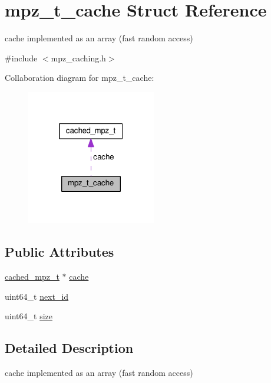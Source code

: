 \hypertarget{structmpz__t__cache}{}\section{mpz\+\_\+t\+\_\+cache Struct Reference}
\label{structmpz__t__cache}


cache implemented as an array (fast random access)  




{\ttfamily \#include $<$mpz\+\_\+caching.\+h$>$}



Collaboration diagram for mpz\+\_\+t\+\_\+cache\+:\nopagebreak
\begin{figure}[H]
\begin{center}
\leavevmode
\includegraphics[width=160pt]{structmpz__t__cache__coll__graph}
\end{center}
\end{figure}
\subsection*{Public Attributes}
\begin{DoxyCompactItemize}
\item 
\hyperlink{structcached__mpz__t}{cached\+\_\+mpz\+\_\+t} $\ast$ \hyperlink{structmpz__t__cache_a68ba0b84ae67ae594f539b466dac5008}{cache}
\item 
uint64\+\_\+t \hyperlink{structmpz__t__cache_ad8f52046ab32c2b94ca4a32f22b4beb7}{next\+\_\+id}
\item 
uint64\+\_\+t \hyperlink{structmpz__t__cache_a00982c72af6f0784f31c8d28bb56fbf8}{size}
\end{DoxyCompactItemize}


\subsection{Detailed Description}
cache implemented as an array (fast random access) 

